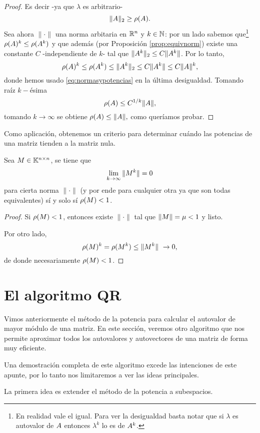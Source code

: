 \begin{proof}
 Es decir -ya que $\lambda$ es arbitrario-
 $$\|\Ab\|_2\ge \rho(\Ab).$$
 Sea ahora $\|\cdot\|$ una norma arbitaria en $\mathbb R^{n}$ y $k\in \mathbb N$: por un lado sabemos que\footnote{En realidad vale el igual. Para ver la desigualdad basta notar que si $\lambda$ es autovalor de $ \Ab$ entonces $\lambda^k$ lo es de $\Ab^k$. }
 $\rho(\Ab)^k\le \rho(\Ab^k)
 $ y que además (por Proposición \ref{prop:equivnorm}) existe una constante $C$ -independiente de $k$- tal que $\|\Ab^k\|_2\le C\|\Ab^k\|$. Por lo tanto,
 $$
 \rho(\Ab)^k\le \rho(\Ab^k)\le \|\Ab^k\|_2\le C\|\Ab^k\|\le C\|\Ab\|^k,
 $$
 donde hemos usado \eqref{eq:normasypotencias} en la última desigualdad. Tomando raíz $k-$ésima
 $$
 \rho(\Ab)\le C^{1/k}\|\Ab\|,
 $$
 tomando $k\to \infty$ se obtiene $
 \rho(\Ab)\le \|\Ab\|,
 $
 como queríamos probar.
\end{proof}



Como aplicación, obtenemos un criterio para determinar cuándo las potencias de una matriz tienden a la matriz nula.

\tcc
\begin{prop}
 Sea $\Mb\in \Knn$, se tiene que
 $$
 \lim_{k\to \infty}\|\Mb^k\|=0
 $$
para cierta norma $\|\cdot\|$ (y por ende para cualquier otra ya que son todas equivalentes) sí y solo sí
 $\rho(\Mb)<1$.
\end{prop}

\etcc

\begin{proof}
 Si $\rho(\Mb)<1$, entonces existe $\|\cdot\|$ tal que $\|\Mb\|=\mu<1$ y listo.

 Por otro lado,
 $$
 \rho(\Mb)^k=
 \rho(\Mb^k)\le
 \|\Mb^k\|\ \to 0,
 $$
 de donde
 necesariamente
 $\rho(\Mb)<1$.
\end{proof}

\section{El algoritmo QR}

Vimos anteriormente el método de la potencia para calcular el autovalor de mayor módulo de una matriz. En este sección, veremos otro algoritmo que nos permite aproximar todos los autovalores y autovectores de una matriz de forma muy eficiente.

Una demostración completa de este algoritmo excede las intenciones de este apunte, por lo tanto nos limitaremos a ver las ideas principales.

La primera idea es extender el método de la potencia a subespacios.

